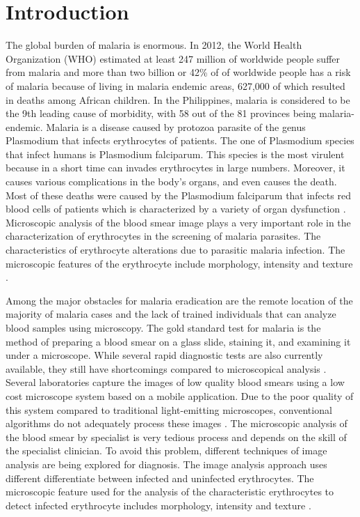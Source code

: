 \section{Introduction}
\label{intro}


The global burden of malaria is enormous. In 2012, the World Health Organization (WHO) estimated at least 247 million of worldwide people suffer from malaria and more than two billion or 42\% of of worldwide people has a risk of malaria because of living in malaria endemic areas, 627,000 of which resulted in deaths among African children. In the Philippines, malaria is considered to be the 9th leading cause of morbidity, with 58 out of the 81 provinces being malaria-endemic. Malaria is a disease caused by protozoa parasite of the genus Plasmodium that infects erythrocytes of patients. The one of Plasmodium species that infect humans is Plasmodium falciparum. This species is the most virulent because in a short time can invades erythrocytes in large numbers. Moreover, it causes various complications in the body's organs, and even causes the death. Most of these deaths were caused by the Plasmodium falciparum that infects red blood cells of patients which is characterized by a variety of organ dysfunction \cite{Dong2017}. Microscopic analysis of the blood smear image plays a very important role in the characterization of erythrocytes in the screening of malaria parasites. The characteristics of erythrocyte alterations due to parasitic malaria infection. The microscopic features of the erythrocyte include morphology, intensity and texture \cite{ShuleendaDevi2016}.



Among the major obstacles for malaria eradication are the remote location of the majority of malaria cases and the lack of trained individuals that can analyze blood samples using
microscopy. The gold standard test for malaria is the method of preparing a blood smear on a glass slide, staining it, and examining it under a microscope. While several rapid diagnostic tests are also currently available, they still have shortcomings compared to microscopical analysis \cite{Quinn2016DeepDiagnostics}\cite{Premaratne2006AFilms}\cite{Penas2017}. Several laboratories capture the images of low quality blood smears using a low cost microscope system based on a mobile application. Due to the poor quality of this system compared to traditional light-emitting microscopes, conventional algorithms do not adequately process these images \cite{Sorgedrager2018}.  The microscopic analysis of the blood smear by specialist is very tedious process and depends on the skill of the specialist clinician. To avoid this problem, different techniques of image analysis are being explored for diagnosis. The image analysis approach uses different differentiate between infected and uninfected erythrocytes. The microscopic feature used for the analysis of the characteristic erythrocytes to detect infected erythrocyte includes morphology, intensity and texture \cite{ShuleendaDevi2016}. 

